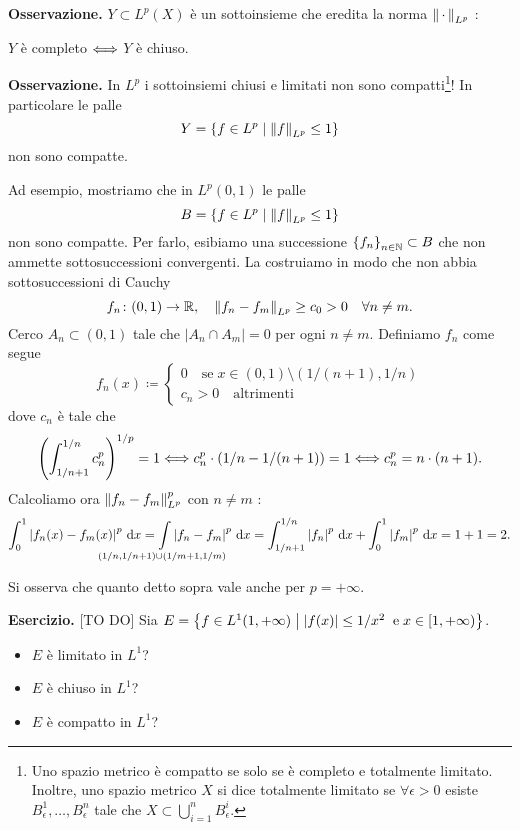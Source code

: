 \textbf{Osservazione.} $Y \subset L^p(X)$ è un sottoinsieme che eredita la norma $\left\lVert \,\cdot\, \right\rVert_{L^p}$ :
\begin{center}
$Y$ è completo $\Longleftrightarrow$ $Y$ è chiuso.
\end{center}

\textbf{Osservazione.} In $L^p$ i sottoinsiemi chiusi e limitati non sono compatti\footnote{Uno spazio metrico è compatto se solo se è completo e totalmente limitato. Inoltre, uno spazio metrico $X$ si dice totalmente limitato se $\forall \epsilon > 0$ esiste $B_\epsilon^1,\ldots,B_\epsilon^n$ tale che $X \subset \bigcup_{i=1}^n B_\epsilon^i$.}!
In particolare le palle
%
$$
Y = \left\{ f \in L^p \;\middle|\; \left\lVert f \right\rVert_{L^p} \leq 1 \right\}
$$
%
non sono compatte.

Ad esempio, mostriamo che in $L^p(0,1)$ le palle 
%
$$
B = \left\{ f \in L^p \;\middle|\; \left\lVert f \right\rVert_{L^p} \leq 1 \right\}
$$
%
non sono compatte.
Per farlo, esibiamo una successione $\left\{ f_n \right\}_{n \in \mathbb N} \subset B$ che non ammette sottosuccessioni convergenti.
La costruiamo in modo che non abbia sottosuccessioni di Cauchy
%
$$
f_n \colon (0,1) \to \mathbb R, \quad \left\lVert f_n - f_m \right\rVert_{L^p} \geq c_0 > 0 \quad  \forall n \neq m.
$$
%
Cerco $A_n \subset (0,1)$ tale che $\left| A_n \cap A_m \right| = 0$ per ogni $n \neq m$.
Definiamo $f_n$ come segue
%
$$
f_n(x) \coloneqq 
\begin{cases}
0 \quad  \text{se} \; x \in (0,1) \setminus (1 / (n+1), 1/ n) \\
c_n > 0 \quad \text{altrimenti}
\end{cases} 
$$
%
dove $c_n$ è tale che 
%
$$
\left( \int_{1 / n+1}^{1 / n} c_n^p  \right)^{1/p} = 1 \Longleftrightarrow 
c_n^p \cdot (1/n - 1/(n+1)) = 1 \Longleftrightarrow c_n^p = n \cdot (n+1).
$$
%
Calcoliamo ora $\left\lVert f_n - f_m \right\rVert^p_{L^p}$ con $n \neq m$ :
%
$$
\int_0^1 \left| f_n(x) - f_m(x) \right|^p \dd x = \int\limits_{\mathclap{(1/n,1/n+1) \cup (1/ m+1,1/m)}} \left| f_n - f_m \right|^p \dd x = \int_{1 / n+1}^{1 / n} \left| f_n \right|^p \dd x + \int_{0}^{1} \left| f_m \right|^p \dd x = 1 + 1 = 2.
$$
%

Si osserva che quanto detto sopra vale anche per $p = + \infty$.

\textbf{Esercizio.} [TO DO] Sia $E = \left\{ f \in L^1(1,+\infty) \;\middle|\; \left| f(x) \right| \leq 1 / x^2 \;\; \text{e} \;x \in [1,+\infty) \right\}$.

\begin{itemize}

\item $E$ è limitato in $L^1$?

\item $E$ è chiuso in $L^1$?

\item $E$ è compatto in $L^1$?

\end{itemize}

